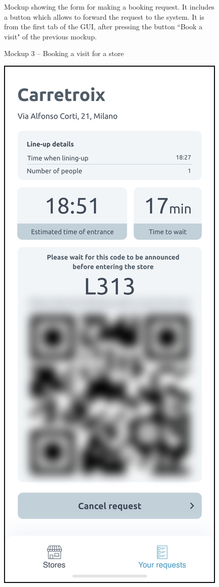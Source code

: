 \documentclass[a4paper,oneside,11pt]{book}
\newcommand{\captiondd}[2]{\caption{#1}\par\begin{center}\vspace{-.01\textheight}\small#2.\end{center}}
\begin{document}
\begin{figure}[H]
            \captiondd{Mockup 3 -- Booking a visit for a store}{Mockup showing the form for making a booking request. It includes a button which allows to forward the request to the system. It is from the first tab of the GUI, after pressing the button ``Book a visit" of the previous mockup}
            \label{figure:mockup_3}
        \end{figure}
    \newpage
    \begin{multicols}{2}
        \begin{figure}[H]
            \centering
            \includegraphics[width=\textwidth, height=.75\textheight, keepaspectratio]{pictures/mockups/active_line_up}

\end{figure}
\end{multicols}
\end{document}

